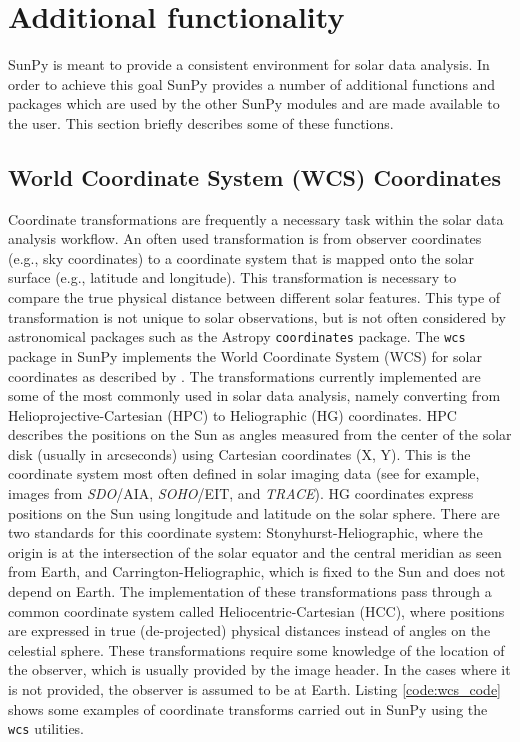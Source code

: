 \section{Additional functionality}\label{sec:util}
SunPy is meant to provide a consistent environment for solar data analysis. In 
order to achieve this goal SunPy provides a number of additional functions and packages which 
are used by the other SunPy modules and are made available to the user. This section 
briefly describes some of these functions.
	
\subsection{World Coordinate System (WCS) Coordinates}\label{ssec:util:wcs}
Coordinate transformations are frequently a necessary task within the solar 
data analysis workflow. An often used transformation is from 
observer coordinates (e.g., sky coordinates) to a coordinate system that is 
mapped onto the solar surface (e.g., latitude and longitude). This 
transformation is necessary to compare the true physical distance between 
different solar features. This type of transformation is not unique
to solar observations, but is not often considered by astronomical packages
such as the Astropy 
\texttt{coordinates} package. The \texttt{wcs} package in SunPy implements the World Coordinate 
System (WCS) for solar coordinates as described by \cite{thompson2006}. The 
transformations currently implemented are some of the most commonly used in solar data analysis, namely converting from Helioprojective-Cartesian 
(HPC) to Heliographic (HG) coordinates. HPC describes the positions on 
the Sun as angles measured from the center of the solar disk (usually in 
arcseconds) using Cartesian coordinates (X, Y). This is the coordinate system 
most often defined in solar imaging data (see for example, images from 
\textit{SDO}/AIA, \textit{SOHO}/EIT, and \textit{TRACE}). 
HG coordinates express positions on the Sun using longitude and latitude on 
the solar sphere. There are two standards for this coordinate system:
Stonyhurst-Heliographic, where the origin is at the intersection of the solar 
equator and the central meridian as seen from Earth, and 
Carrington-Heliographic, which is fixed to the Sun and does not depend on Earth. The 
implementation of these transformations pass through a common coordinate system 
called Heliocentric-Cartesian (HCC), where positions are expressed in true 
(de-projected) physical distances instead of angles on the celestial sphere.
These transformations require some knowledge of the location of the observer, 
which is usually provided by the image header. In the cases where it is 
not provided, the observer is assumed to be at Earth. Listing \ref{code:wcs_code} shows 
some examples of coordinate transforms carried out in SunPy using the 
\texttt{wcs} utilities. 

